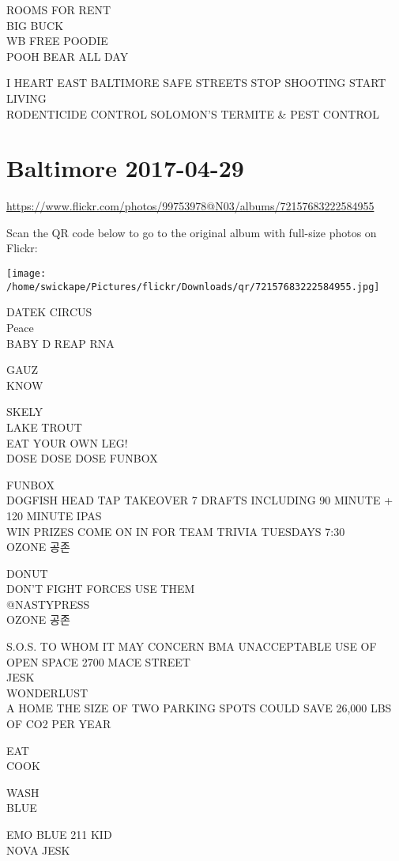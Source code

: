 \documentclass[10pt,letterpaper]{article}
\begin{document}
ROOMS FOR RENT\\
BIG BUCK\\
WB FREE POODIE\\
POOH BEAR ALL DAY

I HEART EAST BALTIMORE SAFE STREETS STOP SHOOTING START LIVING\\
RODENTICIDE CONTROL SOLOMON'S TERMITE \& PEST CONTROL
\pagebreak

\section*{Baltimore 2017-04-29}

\url{https://www.flickr.com/photos/99753978@N03/albums/72157683222584955}

Scan the QR code below to go to the original album with full-size photos on Flickr:

\texttt{[image: /home/swickape/Pictures/flickr/Downloads/qr/72157683222584955.jpg]}
\pagebreak

DATEK CIRCUS\\
Peace\\
BABY D REAP RNA

GAUZ\\
KNOW

SKELY\\
LAKE TROUT\\
EAT YOUR OWN LEG!\\
DOSE DOSE DOSE FUNBOX

FUNBOX\\
DOGFISH HEAD TAP TAKEOVER 7 DRAFTS INCLUDING 90 MINUTE + 120 MINUTE IPAS\\
WIN PRIZES COME ON IN FOR TEAM TRIVIA TUESDAYS 7:30\\
OZONE 공존

DONUT\\
DON'T FIGHT FORCES USE THEM\\
@NASTYPRESS\\
OZONE 공존

S.O.S. TO WHOM IT MAY CONCERN BMA UNACCEPTABLE USE OF OPEN SPACE 2700 MACE STREET\\
JESK\\
WONDERLUST\\
A HOME THE SIZE OF TWO PARKING SPOTS COULD SAVE 26,000 LBS OF CO2 PER YEAR

EAT\\
COOK

WASH\\
BLUE

EMO BLUE 211 KID\\
NOVA JESK
\end{document}

